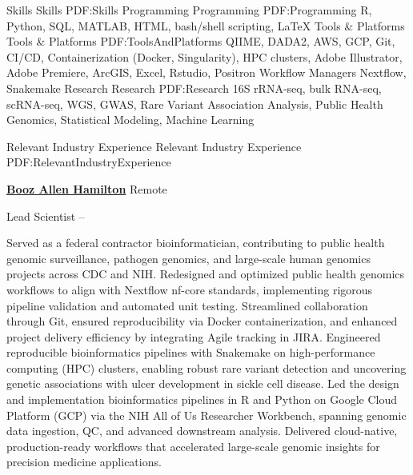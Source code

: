 \documentclass[letterpaper,MMMyyyy,nonstopmode]{simpleresumecv}
\begin{document}
\begin{Body}

\Section
{Skills}
{Skills}
{PDF:Skills}
\BigGap
\SubSection
{Programming}
{Programming}
{PDF:Programming}
\Entry
R, Python, SQL, MATLAB, HTML, bash/shell scripting, {\LaTeX}
\Gap
\SubSection
{Tools \& Platforms}
{Tools \& Platforms}
{PDF:ToolsAndPlatforms}
\Entry
QIIME, DADA2, AWS, GCP, Git, CI/CD, Containerization (Docker, Singularity), HPC clusters, Adobe Illustrator, Adobe Premiere, ArcGIS,
Excel, Rstudio, Positron 
\Gap
\SubSection 
{Workflow Managers}
\Entry 
Nextflow, Snakemake
\Gap
\SubSection
{Research}
{Research}
{PDF:Research}
\Entry
16S rRNA-seq, bulk RNA-seq, scRNA-seq, WGS, GWAS, Rare Variant Association Analysis,  Public Health Genomics, Statistical Modeling, Machine Learning

\Section
{Relevant Industry\newline
Experience}
{Relevant Industry Experience}
{PDF:RelevantIndustryExperience}

\Entry
\href{https://www.boozallen.com/}
{\textbf{Booz Allen Hamilton}}
Remote

\Gap
\BulletItem
Lead Scientist
\hfill
{} --
\begin{Detail}
\SubBulletItem
Served as a federal contractor bioinformatician, contributing to public health genomic surveillance, pathogen genomics, and large-scale human genomics projects across CDC and NIH.
\SubBulletItem
Redesigned and optimized public health genomics workflows to align with Nextflow nf-core standards, implementing rigorous pipeline validation and automated unit testing. Streamlined collaboration through Git, ensured reproducibility via Docker containerization, and enhanced project delivery efficiency by integrating Agile tracking in JIRA.
\SubBulletItem
Engineered reproducible bioinformatics pipelines with Snakemake on high-performance computing \text(HPC\text) clusters, enabling robust rare variant detection and uncovering genetic associations with ulcer development in sickle cell disease.
\SubBulletItem
Led the design and implementation bioinformatics pipelines in R and Python on Google Cloud Platform (GCP) via the NIH All of Us Researcher Workbench, spanning genomic data ingestion, QC, and advanced downstream analysis. Delivered cloud-native, production-ready workflows that accelerated large-scale genomic insights for precision medicine applications.
\end{Detail}


\end{Body}
\end{document}
